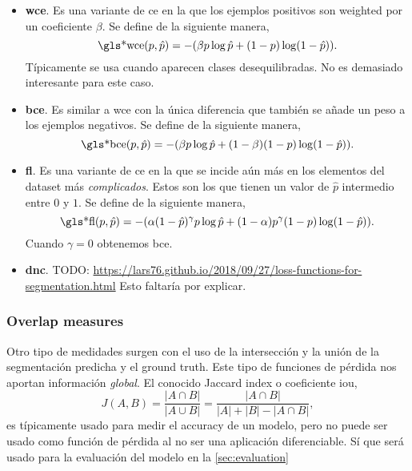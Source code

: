 \begin{itemize}
  \item \textbf{\gls*{wce}}. Es una variante de \gls{ce} en la que los ejemplos
  positivos son weighted por un coeficiente \(\beta\). Se define de la
  siguiente manera,
  \begin{equation}
    \text{\gls*{wce}}(p, \hat{p}) =
    -(\beta p\log\hat{p} + (1 - p)\log(1 - \hat{p})).
  \end{equation}
  Típicamente se usa cuando aparecen clases desequilibradas. No es demasiado
  interesante para este caso.
  \item \textbf{\gls*{bce}}. Es similar a \gls{wce} con la única diferencia que
  también se añade un peso a los ejemplos negativos. Se define de la siguiente
  manera,
  \begin{equation}
    \text{\gls*{bce}}(p, \hat{p}) =
    -(\beta p\log\hat{p} + (1 - \beta)(1 - p)\log(1 - \hat{p})).
  \end{equation}
  \item \textbf{\gls*{fl}}. Es una variante de \gls{ce} en la que se incide aún
  más en los elementos del dataset más \emph{complicados}. Estos son los que
  tienen un valor de \(\hat{p}\) intermedio entre \(0\) y \(1\). Se define de
  la siguiente manera,
  \begin{equation}
    \text{\gls*{fl}}(p, \hat{p}) =
    -(\alpha (1 - \hat{p})^\gamma p\log\hat{p} +
    (1 - \alpha)p^\gamma (1 - p)\log(1 - \hat{p})).
  \end{equation}
  Cuando \(\gamma = 0\) obtenemos \gls{bce}.
  \item \textbf{\gls*{dnc}}. TODO:
  \url{https://lars76.github.io/2018/09/27/loss-functions-for-segmentation.html} Esto
  faltaría por explicar.
\end{itemize}

\subsubsection{Overlap measures}
Otro tipo de medidades surgen con el uso de la intersección y la unión de la
segmentación predicha y el ground truth. Este tipo de funciones de pérdida nos
aportan información \emph{global}. El conocido Jaccard index o coeficiente \gls{iou},
\begin{equation}
  J(A,B) = \frac{|A \cap B|}{|A \cup B|}
  = \frac{|A \cap B|}{|A| + |B| - |A \cap B|},
\end{equation}
es típicamente usado para medir el accuracy de un modelo, pero no puede ser
usado como función de pérdida al no ser una aplicación diferenciable. Sí que
será usado para la evaluación del modelo en la \vref{sec:evaluation}

